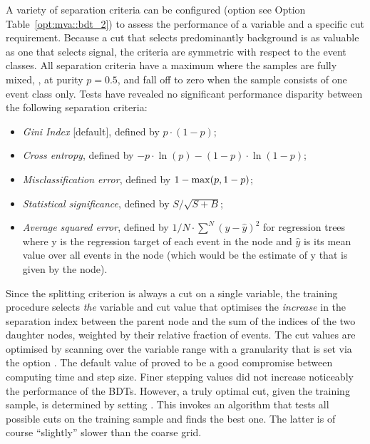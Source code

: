 A variety of separation criteria can be configured (option
 see Option Table~\ref{opt:mva::bdt_2}) 
to assess the performance of a variable and a specific cut requirement. Because a
cut that selects predominantly background is as valuable as one that
selects signal, the criteria are symmetric with respect to the event
classes. All separation criteria have a maximum where the samples are
fully mixed, \ie, at purity $p = 0.5$, and fall off to zero when the
sample consists of one event class only.  Tests have revealed no
significant performance disparity between the following separation
criteria:
\begin{itemize}

\item {\em Gini Index} [default], defined by $p\cdot ( 1 - p )$; 

\item {\em Cross entropy}, defined by $-p \cdot \ln (p) - (1-p)\cdot \ln(1-p)$; 

\item {\em Misclassification error}, defined by $1-{\rm max}(p, 1-p)$; 

\item {\em Statistical significance}, defined by $S/\sqrt{S+B}$;

\item {\em Average squared error}, defined by $1/N\cdot \sum^N (y - {\hat y})^2$ 
  for regression trees where y is the regression target of each event in the node
  and $\hat y$ is its mean value over all events in the node (which would be the
  estimate of y that is given by the node).   
\end{itemize}
Since the splitting criterion is always a cut on a single variable,
the training procedure selects {\em the} variable and cut value that
optimises the {\em increase} in the separation index between the
parent node and the sum of the indices of the two daughter nodes,
weighted by their relative fraction of events. The cut values are
optimised by scanning over the variable range with a granularity that
is set via the option . The default value of
 proved to be a good compromise between computing time
and step size. Finer stepping values did not increase noticeably the
performance of the BDTs. However, a truly optimal cut, given the training
sample, is determined by setting . This invokes an algorithm
that tests all possible cuts on the training sample and finds the best one.
The latter is of course ``slightly'' slower than the coarse grid.

